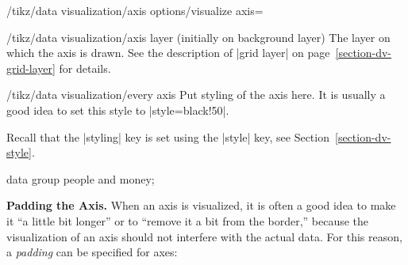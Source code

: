 \begin{key}{/tikz/data visualization/axis options/visualize axis=}
  \begin{stylekey}{/tikz/data visualization/axis layer (initially on
      background layer)}
    The layer on which the axis is drawn. See the description of
    |grid layer| on page~\ref{section-dv-grid-layer} for details.
  \end{stylekey}
  
  \begin{stylekey}{/tikz/data visualization/every axis}
    Put styling of the axis here. It is usually a good idea to set
    this style to |style={black!50}|.
  \end{stylekey}

  Recall that the |styling| key is set using the |style| key, see
  Section~\ref{section-dv-style}. 
\tikzset{
}
\begin{codeexample}[]
\tikz \datavisualization [
    our system,
    x axis={attribute=time, length=4cm},
    left axis ={attribute=money},
    right axis={attribute=people},
    visualize as line/.list={people 1, people 2, money 1, money 2}]
  data group {people and money};  
\end{codeexample}
  
  \medskip
  \textbf{Padding the Axis.}
  When an axis is visualized, it is often a good idea to make it ``a
  little bit longer'' or to ``remove it a bit from the border,'' because
  the visualization of an axis should not interfere with the actual
  data. For this reason, a \emph{padding} can be specified for axes:
  

\end{key}
